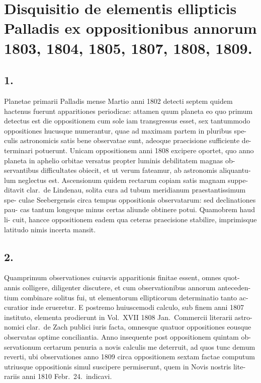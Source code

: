 \documentclass[12pt,a4paper]{article}
\begin{document}
\newpage


\section*{Disquisitio de elementis ellipticis Palladis ex oppositionibus annorum 1803, 1804, 1805, 1807, 1808, 1809.}

\subsection*{1.}

Planetae primarii Palladis mense Martio anni 1802 detecti septem quidem
hactenus fuerunt apparitiones periodicae: attamen quum planeta eo quo primum
detectus est die oppositionem cum sole iam transgressus esset, sex tantummodo
oppositiones hucusque numerantur, quae ad maximam partem in pluribus spe-
culis astronomicis satis bene observatae sunt, adeoque praecisione sufficiente de-
terminari potuerunt. Unicam oppositionem anni 1808 excipere oportet, quo
anno planeta in aphelio orbitae versatus propter luminis debilitatem magnas ob-
servantibus difficultates obiecit, et ut verum fateamur, ab astronomis aliquantu-
lum neglectus est. Ascensionum quidem rectarum copiam satis magnam suppe-
ditavit clar.\ de Lindenau, solita cura ad tubum meridianum praestantissimum spe-
culae Seebergensis circa tempus oppositionis observatarum: sed declinationes pau-
cas tantum longeque minus certas aliunde obtinere potui. Quamobrem haud li-
cuit, hancce oppositionem eadem qua ceteras praecisione stabilire, imprimisque
latitudo nimis incerta mansit.

\subsection*{2.}

Quamprimum observationes cuiusvis apparitionis finitae essent, omnes quot-
annis colligere, diligenter discutere, et cum observationibus annorum anteceden-
tium combinare solitus fui, ut elementorum ellipticorum determinatio tanto ac-
curatior inde erueretur. E postremo huiuscemodi calculo, sub finem anni 1807
instituto, elementa prodierunt in Vol.~XVII 1808 Jan.\ Commercii literarii astro-
nomici clar.\ de Zach publici iuris facta, omnesque quatuor oppositiones eousque
observatas optime conciliantia. Anno insequente post oppositionem quintam ob-
servationum certarum penuria a novis calculis me deterruit, ad quos tunc demum
reverti, ubi observationes anno 1809 circa oppositionem sextam factae computum
utriusque oppositionis simul suscipere permiserunt, quem in Novis nostris lite-
rariis anni 1810 Febr.\ 24.\ indicavi.
\end{document}
